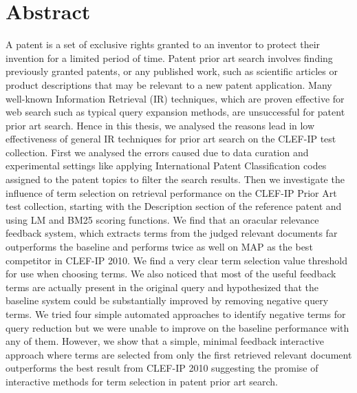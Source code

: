 \chapter*{Abstract}
\vspace{-1em}
A patent is a set of exclusive rights granted to an inventor to protect 
their invention for a limited period of time. Patent prior art search involves 
finding previously granted patents, or any published work, such as scientific 
articles or product descriptions that may be relevant to a new patent application.
Many well-known Information Retrieval (IR) techniques, which are proven effective 
for web search such as typical query expansion methods, are unsuccessful for patent 
prior art search.
Hence in this thesis, we analysed the reasons lead in low effectiveness 
of general IR techniques for prior art search on the CLEF-IP test collection. 
First we analysed the errors caused due to data curation and experimental settings 
like applying International Patent Classification codes assigned to the patent topics 
to filter the search results.  
Then we investigate the influence of term selection on retrieval
performance on the CLEF-IP Prior Art test collection, starting with
the Description section of the reference patent and using LM and BM25
scoring functions. We find that an oracular relevance feedback system,
which extracts terms from the judged relevant documents far
outperforms the baseline and performs twice as well on MAP as the best
competitor in CLEF-IP 2010.  We find a very clear term selection value
threshold for use when choosing terms.  We also noticed that most of
the useful feedback terms are actually present in the original query
and hypothesized that the baseline system could be substantially
improved by removing negative query terms.
We tried four simple automated approaches to identify negative terms
for query reduction but we were unable to improve on the baseline
performance with any of them.  However, we show that a
simple, minimal feedback interactive approach where terms are selected
from only the first retrieved relevant document outperforms the best
result from CLEF-IP 2010 suggesting the promise of interactive methods
for term selection in patent prior art search.

